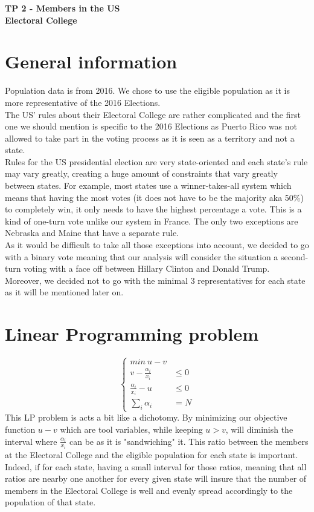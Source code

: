 \documentclass[a4paper,9pt,calibri,oneside,openany, twocolumn]{report}
\theoremstyle{break}
\begin{document}
	\begin{center}
		\bfseries TP 2 - Members in the US\\ Electoral College
	\end{center}
\section*{General information}
Population data is from 2016. We chose to use the eligible population as it is more representative of the 2016 Elections.\\

The US' rules about their Electoral College are rather complicated and the first one we should mention is specific to the 2016 Elections as Puerto Rico was not allowed to take part in the voting process as it is seen as a territory and not a state.\\

Rules for the US presidential election are very state-oriented and each state's rule may vary greatly, creating a huge amount of constraints that vary greatly between states. For example, most states use a winner-takes-all system which means that having the most votes (it does not have to be the majority aka 50\%) to completely win, it only needs to have the highest percentage a vote. This is a kind of one-turn vote unlike our system in France. The only two exceptions are Nebraska and Maine that have a separate rule.\\

As it would be difficult to take all those exceptions into account, we decided to go with a binary vote meaning that our analysis will consider the situation a second-turn voting with a face off between Hillary Clinton and Donald Trump.\\

Moreover, we decided not to go with the minimal $3$ representatives for each state as it will be mentioned later on.
\section*{Linear Programming problem}
\begin{equation}
\begin{cases}
min\ u-v& \\
v - \frac{\alpha_i}{x_i}&\leq 0\\
\frac{\alpha_i}{x_i}- u &\leq 0\\
\sum\limits_i \alpha_i &= N
\end{cases}
\end{equation}
This LP problem is acts a bit like a dichotomy. By minimizing our objective function $u-v$ which are tool variables, while keeping $u>v$, will diminish the interval where $\frac{\alpha_i}{x_i}$ can be as it is "sandwiching" it. This ratio between the members at the Electoral College and the eligible population for each state is important. Indeed, if for each state, having a small interval for those ratios, meaning that all ratios are nearby one another for every given state will insure that the number of members in the Electoral College is well and evenly spread accordingly to the population of that state.\\
\end{document}
